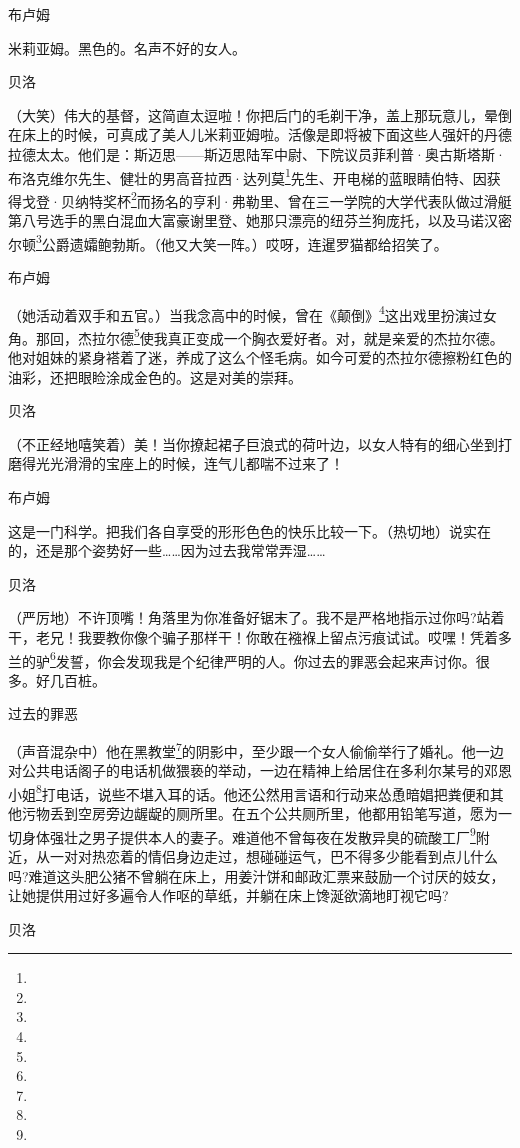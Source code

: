 \par 布卢姆
\par 米莉亚姆。黑色的。名声不好的女人。
\par 贝洛
\par （大笑）伟大的基督，这简直太逗啦！你把后门的毛剃干净，盖上那玩意儿，晕倒在床上的时候，可真成了美人儿米莉亚姆啦。活像是即将被下面这些人强奸的丹德拉德太太。他们是：斯迈思——斯迈思陆军中尉、下院议员菲利普·奥古斯塔斯·布洛克维尔先生、健壮的男高音拉西·达列莫\footnote{}先生、开电梯的蓝眼睛伯特、因获得戈登·贝纳特奖杯\footnote{}而扬名的亨利·弗勒里、曾在三一学院的大学代表队做过滑艇第八号选手的黑白混血大富豪谢里登、她那只漂亮的纽芬兰狗庞托，以及马诺汉密尔顿\footnote{}公爵遗孀鲍勃斯。（他又大笑一阵。）哎呀，连暹罗猫都给招笑了。
\par 布卢姆
\par （她活动着双手和五官。）当我念高中的时候，曾在《颠倒》\footnote{}这出戏里扮演过女角。那回，杰拉尔德\footnote{}使我真正变成一个胸衣爱好者。对，就是亲爱的杰拉尔德。他对姐妹的紧身褡着了迷，养成了这么个怪毛病。如今可爱的杰拉尔德擦粉红色的油彩，还把眼睑涂成金色的。这是对美的崇拜。
\par 贝洛
\par （不正经地嘻笑着）美！当你撩起裙子巨浪式的荷叶边，以女人特有的细心坐到打磨得光光滑滑的宝座上的时候，连气儿都喘不过来了！
\par 布卢姆
\par 这是一门科学。把我们各自享受的形形色色的快乐比较一下。（热切地）说实在的，还是那个姿势好一些……因为过去我常常弄湿……
\par 贝洛
\par （严厉地）不许顶嘴！角落里为你准备好锯末了。我不是严格地指示过你吗?站着干，老兄！我要教你像个骗子那样干！你敢在襁褓上留点污痕试试。哎嘿！凭着多兰的驴\footnote{}发誓，你会发现我是个纪律严明的人。你过去的罪恶会起来声讨你。很多。好几百桩。
\par 过去的罪恶
\par （声音混杂中）他在黑教堂\footnote{}的阴影中，至少跟一个女人偷偷举行了婚礼。他一边对公共电话阁子的电话机做猥亵的举动，一边在精神上给居住在多利尔某号的邓恩小姐\footnote{}打电话，说些不堪入耳的话。他还公然用言语和行动来怂恿暗娼把粪便和其他污物丢到空房旁边龌龊的厕所里。在五个公共厕所里，他都用铅笔写道，愿为一切身体强壮之男子提供本人的妻子。难道他不曾每夜在发散异臭的硫酸工厂\footnote{}附近，从一对对热恋着的情侣身边走过，想碰碰运气，巴不得多少能看到点儿什么吗?难道这头肥公猪不曾躺在床上，用姜汁饼和邮政汇票来鼓励一个讨厌的妓女，让她提供用过好多遍令人作呕的草纸，并躺在床上馋涎欲滴地盯视它吗?
\par 贝洛
